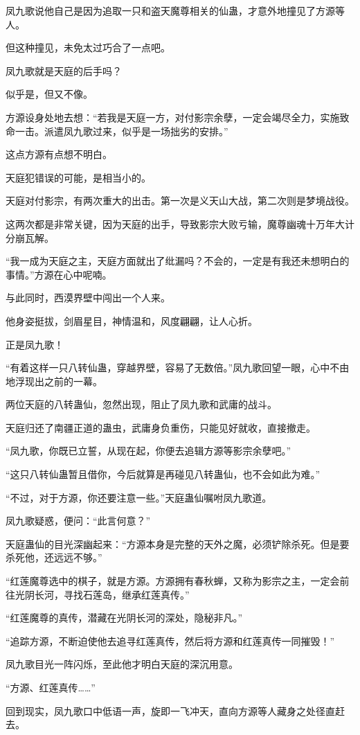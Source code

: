 \begin{this_body}
凤九歌说他自己是因为追取一只和盗天魔尊相关的仙蛊，才意外地撞见了方源等人。

但这种撞见，未免太过巧合了一点吧。

凤九歌就是天庭的后手吗？

似乎是，但又不像。

方源设身处地去想：“若我是天庭一方，对付影宗余孽，一定会竭尽全力，实施致命一击。派遣凤九歌过来，似乎是一场拙劣的安排。”

这点方源有点想不明白。

天庭犯错误的可能，是相当小的。

天庭对付影宗，有两次重大的出击。第一次是义天山大战，第二次则是梦境战役。

这两次都是非常关键，因为天庭的出手，导致影宗大败亏输，魔尊幽魂十万年大计分崩瓦解。

“我一成为天庭之主，天庭方面就出了纰漏吗？不会的，一定是有我还未想明白的事情。”方源在心中呢喃。

与此同时，西漠界壁中闯出一个人来。

他身姿挺拔，剑眉星目，神情温和，风度翩翩，让人心折。

正是凤九歌！

“有着这样一只八转仙蛊，穿越界壁，容易了无数倍。”凤九歌回望一眼，心中不由地浮现出之前的一幕。

两位天庭的八转蛊仙，忽然出现，阻止了凤九歌和武庸的战斗。

天庭归还了南疆正道的蛊虫，武庸身负重伤，只能见好就收，直接撤走。

“凤九歌，你既已立誓，从现在起，你便去追辑方源等影宗余孽吧。”

“这只八转仙蛊暂且借你，今后就算是再碰见八转蛊仙，也不会如此为难。”

“不过，对于方源，你还要注意一些。”天庭蛊仙嘱咐凤九歌道。

凤九歌疑惑，便问：“此言何意？”

天庭蛊仙的目光深幽起来：“方源本身是完整的天外之魔，必须铲除杀死。但是要杀死他，还远远不够。”

“红莲魔尊选中的棋子，就是方源。方源拥有春秋蝉，又称为影宗之主，一定会前往光阴长河，寻找石莲岛，继承红莲真传。”

“红莲魔尊的真传，潜藏在光阴长河的深处，隐秘非凡。”

“追踪方源，不断迫使他去追寻红莲真传，然后将方源和红莲真传一同摧毁！”

凤九歌目光一阵闪烁，至此他才明白天庭的深沉用意。

“方源、红莲真传……”

回到现实，凤九歌口中低语一声，旋即一飞冲天，直向方源等人藏身之处径直赶去。

\end{this_body}

